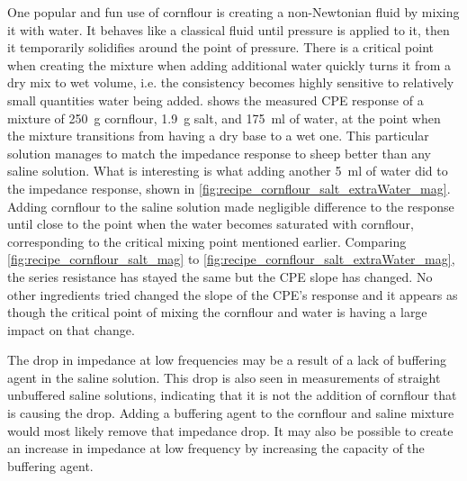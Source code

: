   One popular and fun use of cornflour is creating a non-Newtonian fluid by mixing it with water.
  It behaves like a classical fluid until pressure is applied to it, then it temporarily solidifies around the point of pressure.
  There is a critical point when creating the mixture when adding additional water quickly turns it from a dry mix to wet volume, i.e. the consistency becomes highly sensitive to relatively small quantities water being added.
   shows the measured CPE response of a mixture of \SI{250}{\gram} cornflour, \SI{1.9}{\gram} salt, and \SI{175}{\milli\litre} of water, at the point when the mixture transitions from having a dry base to a wet one.
  This particular solution manages to match the impedance response to sheep better than any saline solution.
  What is interesting is what adding another \SI{5}{\milli\litre} of water did to the impedance response, shown in \cref{fig:recipe_cornflour_salt_extraWater_mag}.
  Adding cornflour to the saline solution made negligible difference to the response until close to the point when the water becomes saturated with cornflour, corresponding to the critical mixing point mentioned earlier.
  Comparing \cref{fig:recipe_cornflour_salt_mag} to \cref{fig:recipe_cornflour_salt_extraWater_mag}, the series resistance has stayed the same but the CPE slope has changed.
  No other ingredients tried changed the slope of the CPE's response and it appears as though the critical point of mixing the cornflour and water is having a large impact on that change.

  The drop in impedance at low frequencies may be a result of a lack of buffering agent in the saline solution.
  This drop is also seen in measurements of straight unbuffered saline solutions, indicating that it is not the addition of cornflour that is causing the drop.
  Adding a buffering agent to the cornflour and saline mixture would most likely remove that impedance drop.
  It may also be possible to create an increase in impedance at low frequency by increasing the capacity of the buffering agent.

